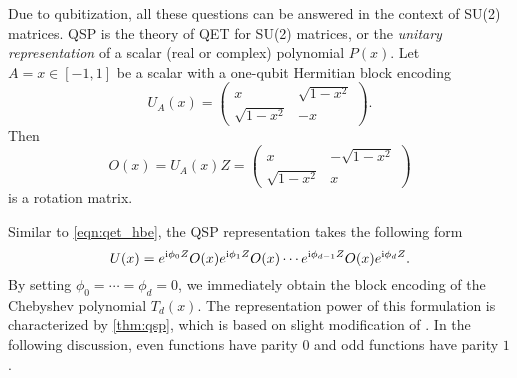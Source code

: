 Due to qubitization, all these questions can be answered in the context of SU(2) matrices. QSP is the theory of QET for SU(2) matrices, or the \emph{unitary representation} of a scalar (real or complex) polynomial $P(x)$. 
Let $A=x\in[-1,1]$ be a scalar with a one-qubit Hermitian block encoding
\begin{equation}
U_A(x)=\begin{pmatrix}
x & \sqrt{1-x^2}\\
\sqrt{1-x^2} & -x
\end{pmatrix}.
\end{equation}
Then
\begin{equation}
O(x)=U_A(x)Z=\begin{pmatrix}
x & -\sqrt{1-x^2}\\
\sqrt{1-x^2} & x
\end{pmatrix}
\end{equation}
is a rotation matrix.

Similar to \cref{eqn:qet_hbe}, the QSP representation takes the following form
\begin{equation}\label{eqn:qsp_o_convention}
U(x)= e^{\mathrm{i} \phi_0 Z} O(x) e^{\mathrm{i} \phi_1 Z} O(x) \cdots e^{\mathrm{i} \phi_{d-1} Z} O(x) e^{\mathrm{i} \phi_{d} Z}.
\end{equation}
By setting $\phi_0=\cdots=\phi_d=0$, we immediately obtain the block encoding of the Chebyshev polynomial $T_d(x)$.
The representation power of this formulation is characterized by \cref{thm:qsp}, which is based on slight modification of \cite[Theorem 4]{GilyenSuLowEtAl2019}.
In the following discussion, even functions have parity $0$ and odd functions have parity $1$.

